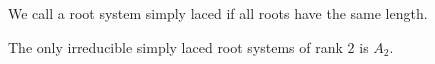 We call a root system simply laced if all roots have the same length.

The only irreducible simply laced root systems of rank $2$ is $A_2$.
